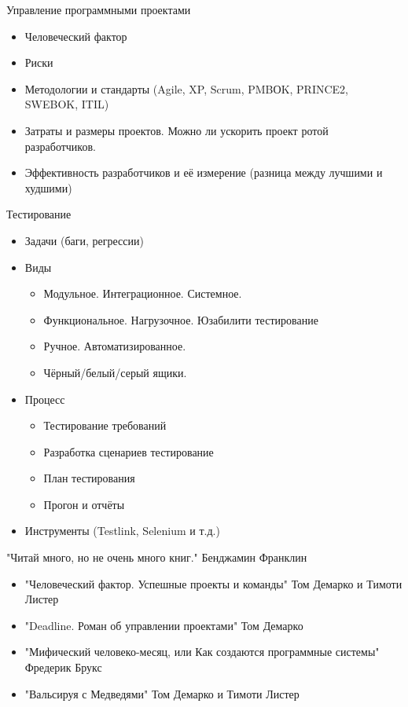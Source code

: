 \documentclass[aspectratio=169]{beamer}
\begin{document}
\begin{frame}{Управление программными проектами}
\begin{itemize}
\item Человеческий фактор
\pause
\item Риски
\pause
\item Методологии и стандарты (Agile, XP, Scrum, PMBОK, PRINCE2, SWEBOK, ITIL)
\pause
\item Затраты и размеры проектов. Можно ли ускорить проект ротой разработчиков.
\pause
\item Эффективность разработчиков и её измерение (разница между лучшими и худшими)
\end{itemize}
\end{frame}

\begin{frame}{Тестирование}
\begin{itemize}
\item Задачи (баги, регрессии)
\pause
\item Виды
\begin{itemize}
\item Модульное. Интеграционное. Системное.
\item Функциональное. Нагрузочное. Юзабилити тестирование
\item Ручное. Автоматизированное.
\item Чёрный/белый/серый ящики.
\end{itemize}
\pause
\item Процесс
\begin{itemize}
\item Тестирование требований
\item Разработка сценариев тестирование
\item План тестирования
\item Прогон и отчёты
\end{itemize}
\pause
\item Инструменты (Testlink, Selenium и т.д.)
\end{itemize}
\end{frame}

\begin{frame}{"Читай много, но не очень много книг." Бенджамин Франклин}
\begin{itemize}
\item "Человеческий фактор. Успешные проекты и команды" Том Демарко и Тимоти Листер
\pause
\item "Deadline. Роман об управлении проектами" Том Демарко
\pause
\item "Мифический человеко-месяц, или Как создаются программные системы" Фредерик Брукс
\pause
\item "Вальсируя с Медведями" Том Демарко и Тимоти Листер
\end{itemize}
\end{frame}
\end{document}
